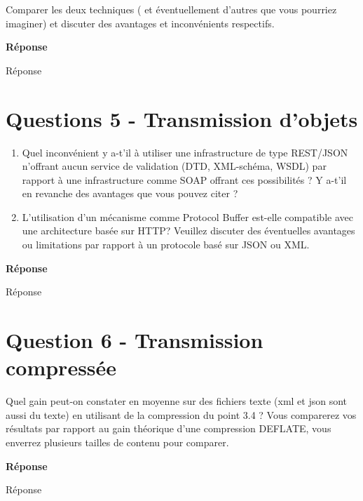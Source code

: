 \documentclass[francais,12pt]{article}
\begin{document}
	Comparer les deux techniques ( et éventuellement d'autres que vous pourriez imaginer) et discuter des avantages et inconvénients respectifs.
	
	{\color[rgb]{0,0.5,0.23}\textbf{Réponse}}
	
	Réponse
	
	
	\section*{Questions 5 - Transmission d'objets}  
	\begin{enumerate}
		\item Quel inconvénient y a-t'il à utiliser une infrastructure de type REST/JSON n'offrant aucun service de validation (DTD, XML-schéma, WSDL) par rapport à une infrastructure comme SOAP offrant ces possibilités ? Y a-t'il en revanche des avantages que vous pouvez citer ?
		\item L'utilisation d'un mécanisme comme Protocol Buffer est-elle compatible avec une architecture basée sur HTTP? Veuillez discuter des éventuelles avantages ou limitations par rapport à un protocole basé sur JSON ou XML.
	\end{enumerate} 
	
	{\color[rgb]{0,0.5,0.23}\textbf{Réponse}}
	
	Réponse
	
	\section*{Question 6 - Transmission compressée}
	Quel gain peut-on constater en moyenne sur des fichiers texte (xml et json sont aussi du texte) en utilisant de la compression du point 3.4 ? Vous comparerez vos résultats par rapport au gain théorique d'une compression DEFLATE, vous enverrez plusieurs tailles de contenu pour comparer.
	
	{\color[rgb]{0,0.5,0.23}\textbf{Réponse}}
	
	Réponse
	
	
\end{document}
